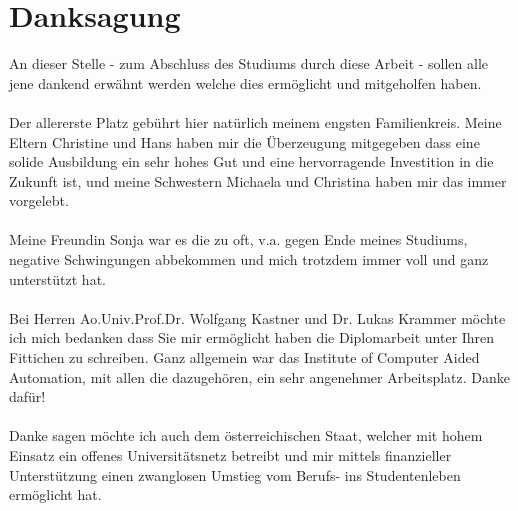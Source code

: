\chapter*{Danksagung}

An dieser Stelle - zum Abschluss des Studiums durch diese Arbeit - sollen alle jene dankend erwähnt werden welche dies ermöglicht und mitgeholfen haben.
\\
\\
Der allererste Platz gebührt hier natürlich meinem engsten Familienkreis. Meine Eltern Christine und Hans haben mir die Überzeugung mitgegeben dass eine solide Ausbildung ein
sehr hohes Gut und eine hervorragende Investition in die Zukunft ist, und meine Schwestern Michaela und Christina haben mir das immer vorgelebt.
\\
\\
Meine Freundin Sonja war es die zu oft, v.a. gegen Ende meines Studiums, negative Schwingungen abbekommen und mich trotzdem immer voll und ganz unterstützt hat.
\\
\\
Bei Herren Ao.Univ.Prof.Dr. Wolfgang Kastner und Dr. Lukas Krammer möchte ich mich bedanken dass Sie mir ermöglicht haben die Diplomarbeit unter Ihren Fittichen
zu schreiben. Ganz allgemein war das Institute of Computer Aided Automation, mit allen die dazugehören, ein sehr angenehmer Arbeitsplatz. Danke dafür!
\\
\\
Danke sagen möchte ich auch dem österreichischen Staat, welcher mit hohem Einsatz ein offenes Universitätsnetz betreibt und mir mittels finanzieller Unterstützung
einen zwanglosen Umstieg vom Berufs- ins Studentenleben ermöglicht hat.